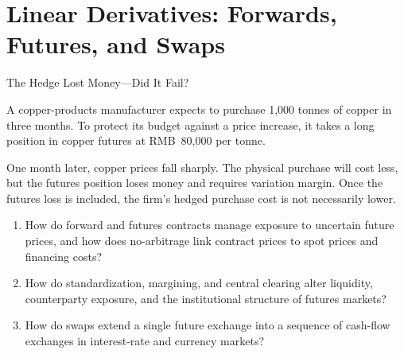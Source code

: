 \chapter{Linear Derivatives: Forwards, Futures, and Swaps}
\label{chap:Linear_Derivatives_Forwards_Futures_and_Swaps}

\begin{openingcase}{The Hedge Lost Money---Did It Fail?}

A copper-products manufacturer expects to purchase 1,000 tonnes of copper in three months. To protect its budget against a price increase, it takes a long position in copper futures at RMB~80,000 per tonne.

One month later, copper prices fall sharply. The physical purchase will cost less, but the futures position loses money and requires variation margin. Once the futures loss is included, the firm's hedged purchase cost is not necessarily lower. 

\end{openingcase}


\begin{tcolorbox}[
  enhanced,
  colback=FinanceBlue!6,
  colframe=FinanceBlue,
  boxrule=0.6pt,
  sharp corners,
  left=8pt,
  right=8pt,
  top=7pt,
  bottom=7pt,
  before skip=1em,
  after skip=1.6em,
  title=\textbf{Core Questions},
  coltitle=white,
  colbacktitle=FinanceBlue,
  fonttitle=\bfseries,
  attach boxed title to top left={xshift=6pt,yshift=-2mm},
  boxed title style={
    boxrule=0pt,
    sharp corners,
    left=5pt,
    right=5pt,
    top=2pt,
    bottom=2pt
  }
]
\begin{enumerate}[
  leftmargin=*,
  label=\textcolor{FinanceBlue}{\textbf{\arabic*.}},
  itemsep=0.55em,
  topsep=0.2em
]



\item How do forward and futures contracts manage exposure to uncertain future prices, and how does no-arbitrage link contract prices to spot prices and financing costs?

\item How do standardization, margining, and central clearing alter liquidity, counterparty exposure, and the institutional structure of futures markets?

\item How do swaps extend a single future exchange into a sequence of cash-flow exchanges in interest-rate and currency markets?



\end{enumerate}
\end{tcolorbox}


